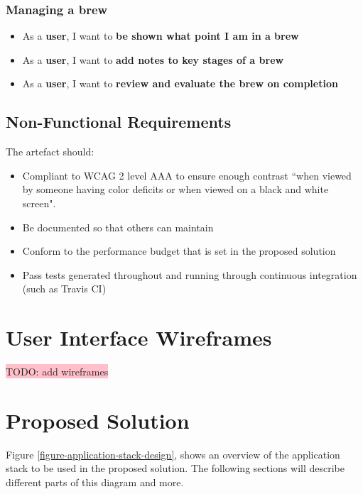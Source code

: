 \subsubsection{Managing a brew}

\begin{itemize}
  \item As a \textbf{user}, I want to \textbf{be shown what point I am in a brew}
  \item As a \textbf{user}, I want to \textbf{add notes to key stages of a brew}
  \item As a \textbf{user}, I want to \textbf{review and evaluate the brew on completion}
\end{itemize}

\subsection{Non-Functional Requirements} \label{a-d--requirements--non-functional}

The artefact should:

\begin{itemize}
  \item Compliant to WCAG 2 level AAA to ensure enough contrast ``when viewed by someone having color deficits or when viewed on a black and white screen". \cite{colour_contrast}
  \item Be documented so that others can maintain
  \item Conform to the performance budget that is set in the proposed solution
  \item Pass tests generated throughout and running through continuous integration (such as Travis CI)
\end{itemize}

\section{User Interface Wireframes}

\colorbox{pink}{TODO: add wireframes}

\section{Proposed Solution} \label{a-d--proposed-solution}

Figure \ref{figure-application-stack-design}, shows an overview of the application stack to be used in the proposed solution. The following sections will describe different parts of this diagram and more.

